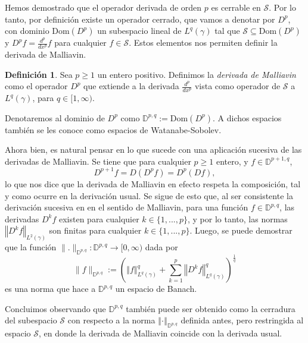 \documentclass[letterpaper,twoside,12pt]{book}
\newcommand{\D}{\mathbb{D}}
\renewcommand{\S}{\mathcal{S}}
\newcommand{\1}{\mathds{1}}
\newcommand{\norm}[1]{\left\Vert #1 \right\Vert}
\theoremstyle{definition}
\newtheorem{dfn}{Definición}
\theoremstyle{definition}
\theoremstyle{remark}
\theoremstyle{definition}
\theoremstyle{definition}
\theoremstyle{definition}
\theoremstyle{definition}
\theoremstyle{definition}
\begin{document}
Hemos demostrado que el operador derivada de orden $p$ es cerrable en $\S$. Por lo tanto, por definición existe un operador cerrado, que vamos a denotar por $D^{p}$, con dominio $\text{Dom}(D^{p})$ un subespacio lineal de $L^{q}(\gamma)$ tal que $\S\subseteq \text{Dom}(D^{p})$ y $D^{p}f=\frac{d^{p}}{dx^{p}}f$ para cualquier $f\in \S$. Estos elementos nos permiten definir la derivada de Malliavin.

\begin{dfn}
   Sea $p\geq1$ un entero positivo. Definimos la \textit{derivada de Malliavin} como el operador $D^{p}$ que extiende a la derivada $\frac{d^{p}}{dx^{p}}$ vista como operador de $\S$ a $L^{q}(\gamma)$, para $q\in [1,\infty)$.
\end{dfn}

Denotaremos al dominio de $D^{p}$ como $\D^{p,q}:=\text{Dom}(D^{p})$. A dichos espacios también se les conoce como espacios de Watanabe-Sobolev. 

Ahora bien, es natural pensar en lo que sucede con una aplicación sucesiva de las derivadas de Malliavin. Se tiene que para cualquier $p\geq1$ entero, y $f\in \D^{p+1,q}$, 
\[
   D^{p+1}f=D(D^{p}f)=D^{p}(Df),
\]
lo que nos dice que la derivada de Malliavin en efecto respeta la composición, tal y como ocurre en la derivación usual. Se sigue de esto que, al ser consistente la derivación sucesiva en en el sentido de Malliavin, para una función $f\in \D^{p,q}$, las derivadas $D^{k}f$ existen para cualquier $k\in \{1,...,p\}$, y por lo tanto, las normas $\norm{D^kf}_{L^2(\gamma)}$ son finitas para cualquier $k\in \{1,...,p\}$. Luego, se puede demostrar que la función $\|.\|_{\mathbb{D}^{p,q}}:\D^{p,q}\longrightarrow[0,\infty)$ dada por
\[
   \|f\|_{\D^{p,q}}:=\left(\norm{f}_{L^{q}(\gamma)}^q+\sum_{k=1}^p\norm{D^{k}f}_{L^{q}(\gamma)}^{q}\right)^{\frac{1}{q}}
\] 
es una norma que hace a $\D^{p,q}$ un espacio de Banach.

Concluimos observando que $\D^{p,q}$ también puede ser obtenido como la cerradura del subespacio $\S$ con respecto a la norma $\norm{\cdot}_{\D^{p,q}}$ definida antes, pero restringida al espacio $\S$, en donde la derivada de Malliavin coincide con la derivada usual.
\end{document}
